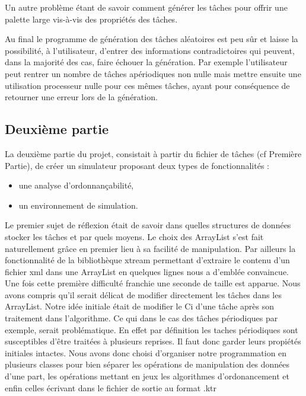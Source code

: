 Un autre problème étant de savoir comment générer les tâches pour offrir une palette large vis-à-vis des propriétés des tâches.

Au final le programme de génération des tâches aléatoires est peu sûr et laisse la possibilité, à l'utilisateur, d'entrer des informations contradictoires qui peuvent, dans la majorité des cas, faire échouer la génération.
Par exemple l'utilisateur peut rentrer un nombre de tâches apériodiques non nulle mais mettre ensuite une utilisation processeur nulle pour ces mêmes tâches, ayant pour conséquence de retourner une erreur lors de la génération.

\subsection{Deuxième partie}\label{Part2}
La deuxième partie du projet, consistait à partir du fichier de tâches (cf Première Partie), de créer un simulateur proposant  deux types de fonctionnalités :
\begin{itemize}
\item
une analyse d'ordonnançabilité,
\item
un environnement de simulation.
\end{itemize}
Le premier sujet de réflexion était de savoir dans quelles structures de données stocker les tâches et par quels moyens. Le choix des ArrayList s'est fait naturellement grâce en premier lieu à sa facilité de manipulation. Par ailleurs la fonctionnalité de la bibliothèque xtream permettant d'extraire le contenu d'un fichier xml dans une ArrayList en quelques lignes nous a d'emblée convaincue. Une fois cette première difficulté franchie une seconde de taille est apparue. Nous avons compris qu'il serait délicat de modifier directement les tâches dans les ArrayList. Notre idée initiale était de  modifier le Ci d'une  tâche après son traitement dans l'algorithme. Ce qui dans le cas des tâches périodiques par exemple, serait problématique. En effet par définition les taches périodiques  sont susceptibles  d'être traitées à plusieurs reprises. Il faut donc garder leurs propiétés initiales intactes. Nous avons donc choisi d'organiser notre programmation en plusieurs classes pour bien séparer les opérations de manipulation des données d'une part, les opérations mettant en jeux les algorithmes d'ordonancement et enfin celles écrivant dans le fichier de sortie au format .ktr

